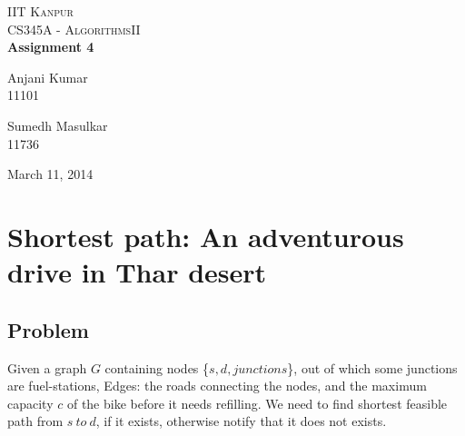 \documentclass[pdftex,a4paper,12pt]{report}
\begin{document}
\begin{titlepage}
\begin{center}

\textsc{\LARGE IIT Kanpur}\\[1.5cm]

\textsc{\Large CS345A - AlgorithmsII}\\[0.5cm]

{ \huge \bfseries Assignment 4 \\[0.4cm] }


\begin{minipage}{0.4\textwidth}
\begin{flushleft} \large
Anjani Kumar\\
11101
\end{flushleft}
\end{minipage}
\begin{minipage}{0.4\textwidth}
\begin{flushright} \large
Sumedh Masulkar\\
11736
\end{flushright}
\end{minipage}

\vfill

{\large March 11, 2014}

\end{center}
\end{titlepage}

\tableofcontents
\newpage

\section{Shortest path: An adventurous drive in Thar desert}
\subsection{Problem}
Given a graph $G$ containing nodes \{$s,d,junctions$\}, out of which some junctions are fuel-stations, Edges: the roads connecting the nodes, and the maximum capacity $c$ of the bike before it needs refilling. We need to find shortest feasible path from $s\ to\ d$, if it exists, otherwise notify that it does not exists. 
\end{document}

